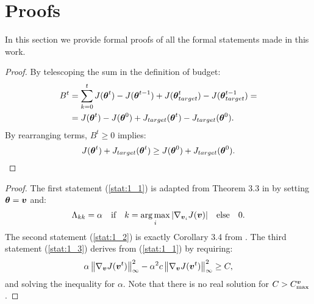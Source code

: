 \chapter{Proofs}
\label{app:proofs}
\thispagestyle{empty}



In this section we provide formal proofs of all the formal statements made in this work.

\nonnegativebudget*
\begin{proof}
	By telescoping the sum in the definition of budget:
	\begin{align*}
	B^t &= \sum_{k=0}^t J(\vtheta^t) - J(\vtheta^{t-1}) + J(\vtheta_{target}^t) - J(\vtheta_{target}^{t-1}) 
	=\\&= J(\vtheta^t) - J(\vtheta^0) + J_{target}(\vtheta^t) - J_{target}(\vtheta^0).
	\end{align*}
	By rearranging terms, $B^t \geq 0$ implies:
	\begin{equation*}
	J(\vtheta^t)  + J_{target}(\vtheta^t)  \geq J(\vtheta^0) + J_{target}(\vtheta^0).
	\end{equation*}
\end{proof}

\safetheta*
\begin{proof}
The first statement (\ref{stat:1_1}) is adapted from Theorem 3.3 in \cite{adaptive_batch} by setting $\vtheta = \vv$ and:
\[
	\Lambda_{kk} = \alpha \quad\text{if}\quad  k=\argmax_i |\gradJ[\vv_i]{\vv}|
	\quad \text{else} \quad 0.
\]
The second statement (\ref{stat:1_2}) is exactly Corollary 3.4 from \cite{adaptive_batch}.
The third statement (\ref{stat:1_3}) derives from (\ref{stat:1_1}) by requiring:
\[
	\alpha\norm[\infty]{\gradJ[\vv]{\vv^t}}^2 - 
	\alpha^2 c \norm[\infty]{\gradJ[\vv]{\vv^t}}^2 \geq C,
\]
and solving the inequality for $\alpha$. Note that there is no real solution for $C>C_{\text{max}}^{\vv}$.
\end{proof}

